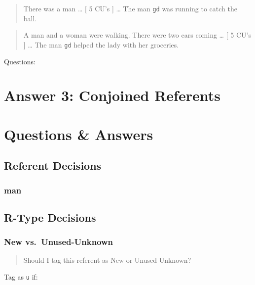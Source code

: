 \documentclass[
]{book}
\begin{document}
\begin{quote}
There was a man \ldots{}
{[} 5 CU's {]} \ldots{}
The man \texttt{gd} was running to catch the ball.
\end{quote}

\begin{quote}
A man and a woman were walking.
There were two cars coming \ldots{}
{[} 5 CU's {]} \ldots{}
The man \texttt{gd} helped the lady with her groceries.
\end{quote}

Questions:

\hypertarget{answer-3-conjoined-referents}{%
\chapter{Answer 3: Conjoined Referents}\label{answer-3-conjoined-referents}}

\hypertarget{questions-answers}{%
\chapter{Questions \& Answers}\label{questions-answers}}

\hypertarget{referent-decisions}{%
\section{Referent Decisions}\label{referent-decisions}}

\hypertarget{man-1}{%
\subsection{man}\label{man-1}}

\hypertarget{r-type-decisions}{%
\section{R-Type Decisions}\label{r-type-decisions}}

\hypertarget{new-vs.-unused-unknown}{%
\subsection{New vs.~Unused-Unknown}\label{new-vs.-unused-unknown}}

\begin{quote}
Should I tag this referent as New or Unused-Unknown?
\end{quote}

Tag as \texttt{u} if:
\end{document}
